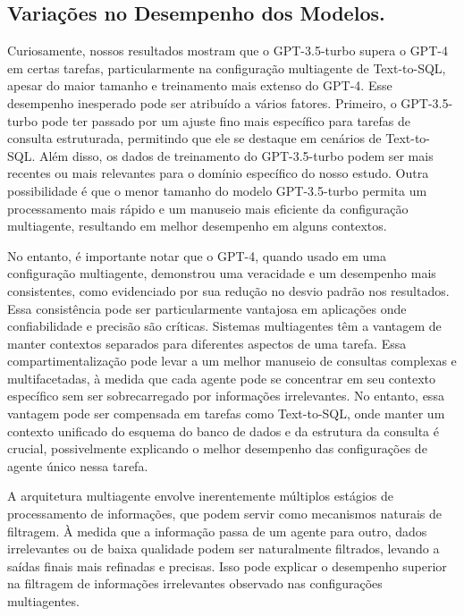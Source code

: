         \subsection{Variações no Desempenho dos Modelos.}
            Curiosamente, nossos resultados mostram que o GPT-3.5-turbo supera o GPT-4 em certas tarefas, particularmente na configuração multiagente de Text-to-SQL, apesar do maior tamanho e treinamento mais extenso do GPT-4. Esse desempenho inesperado pode ser atribuído a vários fatores. Primeiro, o GPT-3.5-turbo pode ter passado por um ajuste fino mais específico para tarefas de consulta estruturada, permitindo que ele se destaque em cenários de Text-to-SQL. Além disso, os dados de treinamento do GPT-3.5-turbo podem ser mais recentes ou mais relevantes para o domínio específico do nosso estudo. Outra possibilidade é que o menor tamanho do modelo GPT-3.5-turbo permita um processamento mais rápido e um manuseio mais eficiente da configuração multiagente, resultando em melhor desempenho em alguns contextos.
            
            No entanto, é importante notar que o GPT-4, quando usado em uma configuração multiagente, demonstrou uma veracidade e um desempenho mais consistentes, como evidenciado por sua redução no desvio padrão nos resultados. Essa consistência pode ser particularmente vantajosa em aplicações onde confiabilidade e precisão são críticas. Sistemas multiagentes têm a vantagem de manter contextos separados para diferentes aspectos de uma tarefa. Essa compartimentalização pode levar a um melhor manuseio de consultas complexas e multifacetadas, à medida que cada agente pode se concentrar em seu contexto específico sem ser sobrecarregado por informações irrelevantes. No entanto, essa vantagem pode ser compensada em tarefas como Text-to-SQL, onde manter um contexto unificado do esquema do banco de dados e da estrutura da consulta é crucial, possivelmente explicando o melhor desempenho das configurações de agente único nessa tarefa.
            
            A arquitetura multiagente envolve inerentemente múltiplos estágios de processamento de informações, que podem servir como mecanismos naturais de filtragem. À medida que a informação passa de um agente para outro, dados irrelevantes ou de baixa qualidade podem ser naturalmente filtrados, levando a saídas finais mais refinadas e precisas. Isso pode explicar o desempenho superior na filtragem de informações irrelevantes observado nas configurações multiagentes.
    
